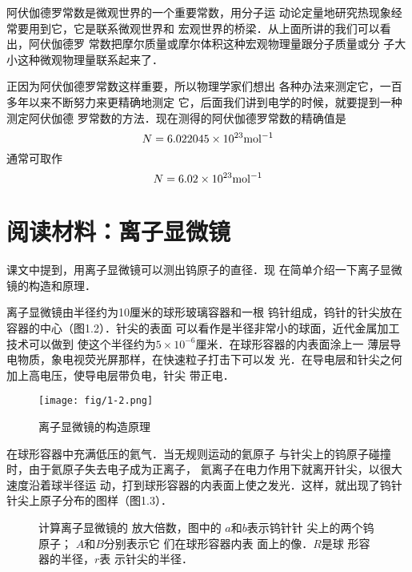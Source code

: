     阿伏伽德罗常数是微观世界的一个重要常数，用分子运
动论定量地研究热现象经常要用到它，它是联系微观世界和
宏观世界的桥梁．从上面所讲的我们可以看出，阿伏伽德罗
常数把摩尔质量或摩尔体积这种宏观物理量跟分子质量或分
子大小这种微观物理量联系起来了．

    正因为阿伏伽德罗常数这样重要，所以物理学家们想出
各种办法来测定它，一百多年以来不断努力来更精确地测定
它，后面我们讲到电学的时候，就要提到一种测定阿伏伽德
罗常数的方法．现在测得的阿伏伽德罗常数的精确值是
\[N=6.022045\times 10^{23}{\rm mol^{-1}} \]
通常可取作
\[N=6.02\times 10^{23}{\rm mol^{-1}} \]

\section*{阅读材料：离子显微镜}
    课文中提到，用离子显微镜可以测出钨原子的直径．现
在简单介绍一下离子显微镜的构造和原理．

    离子显微镜由半径约为10厘米的球形玻璃容器和一根
钨针组成，钨针的针尖放在容器的中心（图1.2）．针尖的表面
可以看作是半径非常小的球面，近代金属加工技术可以做到
使这个半径约为$5\times 10^{-6}$厘米．在球形容器的内表面涂上一
薄层导电物质，象电视荧光屏那样，在快速粒子打击下可以发
光．在导电层和针尖之何加上高电压，使导电层带负电，针尖
带正电．

\begin{figure}
\centering
\texttt{[image: fig/1-2.png]}
\caption{离子显微镜的构造原理
}
\end{figure}


    在球形容器中充满低压的氦气．当无规则运动的氦原子
与针尖上的钨原子碰撞时，由于氦原子失去电子成为正离子，
氦离子在电力作用下就离开针尖，以很大速度沿着球半径运
动，打到球形容器的内表面上使之发光．这样，就出现了钨针
针尖上原子分布的图样（图1.3）．

\begin{figure}
\centering
\caption{计算离子显微镜的
放大倍数，图中的
$a$和$b$表示钨针针
尖上的两个钨原子；
$A$和$B$分别表示它
们在球形容器内表
面上的像．$R$是球
形容器的半径，$r$表
示针尖的半径．
}
\end{figure}

